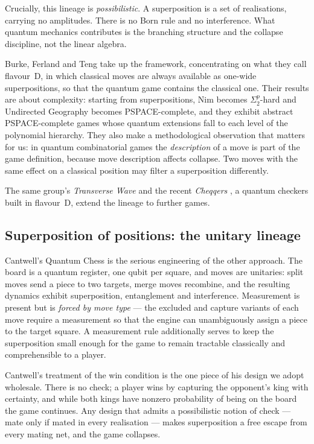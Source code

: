 \documentclass[11pt,a4paper]{article}
\theoremstyle{definition}
\theoremstyle{plain}
\begin{document}
Crucially, this lineage is \emph{possibilistic}. A superposition is a set of
realisations, carrying no amplitudes. There is no Born rule and no
interference. What quantum mechanics contributes is the branching structure and
the collapse discipline, not the linear algebra.

Burke, Ferland and Teng \cite{burke2020,burke2022} take up the framework,
concentrating on what they call flavour~D, in which classical moves are always
available as one-wide superpositions, so that the quantum game contains the
classical one. Their results are about complexity: starting from
superpositions, Nim becomes $\Sigma_2^p$-hard and Undirected Geography becomes
PSPACE-complete, and they exhibit abstract PSPACE-complete games whose quantum
extensions fall to each level of the polynomial hierarchy. They also make a
methodological observation that matters for us: in quantum combinatorial games
the \emph{description} of a move is part of the game definition, because move
description affects collapse. Two moves with the same effect on a classical
position may filter a superposition differently.

The same group's \emph{Transverse Wave} \cite{burke2021} and the recent
\emph{Cheqqers} \cite{cheqqers2025}, a quantum checkers built in flavour~D,
extend the lineage to further games.

\subsection{Superposition of positions: the unitary lineage}

Cantwell's Quantum Chess \cite{cantwell2019} is the serious engineering of the
other approach. The board is a quantum register, one qubit per square, and
moves are unitaries: split moves send a piece to two targets, merge moves
recombine, and the resulting dynamics exhibit superposition, entanglement and
interference. Measurement is present but is \emph{forced by move type} --- the
excluded and capture variants of each move require a measurement so that the
engine can unambiguously assign a piece to the target square. A measurement
rule additionally serves to keep the superposition small enough for the game to
remain tractable classically and comprehensible to a player.

Cantwell's treatment of the win condition is the one piece of his design we
adopt wholesale. There is no check; a player wins by capturing the opponent's
king with certainty, and while both kings have nonzero probability of being on
the board the game continues. Any design that admits a possibilistic notion of
check --- mate only if mated in every realisation --- makes superposition a
free escape from every mating net, and the game collapses.
\end{document}
